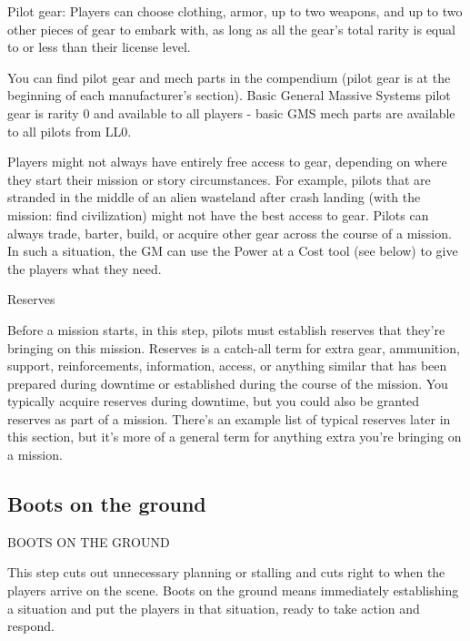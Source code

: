 Pilot gear: Players can choose clothing, armor, up to two weapons, and up to two other  
pieces of gear to embark with, as long as all the gear’s total rarity is equal to or less than their  
license level.
 

You can find pilot gear and mech parts in the compendium (pilot gear is at the beginning of each  
manufacturer’s section). Basic General Massive Systems pilot gear is rarity 0 and available to all  
players - basic GMS mech parts are available to all pilots from LL0.
 

                                                                                                                   


Players might not always have entirely free access to gear, depending on where they start their  
mission or story circumstances. For example, pilots that are stranded in the middle of an alien  
wasteland after crash landing (with the mission: find civilization) might not have the best access  
to gear. Pilots can always trade, barter, build, or acquire other gear across the course of a  
mission. In such a situation, the GM can use the Power at a Cost tool (see below) to give the  
players what they need.
 

                                                    Reserves
 

Before a mission starts, in this step, pilots must establish reserves that they’re bringing on this  
mission. Reserves is a catch-all term for extra gear, ammunition, support, reinforcements,  
information, access, or anything similar that has been prepared during downtime or established  
during the course of the mission. You typically acquire reserves during downtime, but you could  
also be granted reserves as part of a mission. There’s an example list of typical reserves later in  
this section, but it’s more of a general term for anything extra you’re bringing on a mission.
 
\subsection{Boots on the ground}
                                  BOOTS ON THE GROUND
 

This step cuts out unnecessary planning or stalling and cuts right to when the players arrive on  
the scene. Boots on the ground means immediately establishing a situation and put the players  
in that situation, ready to take action and respond. 
 

